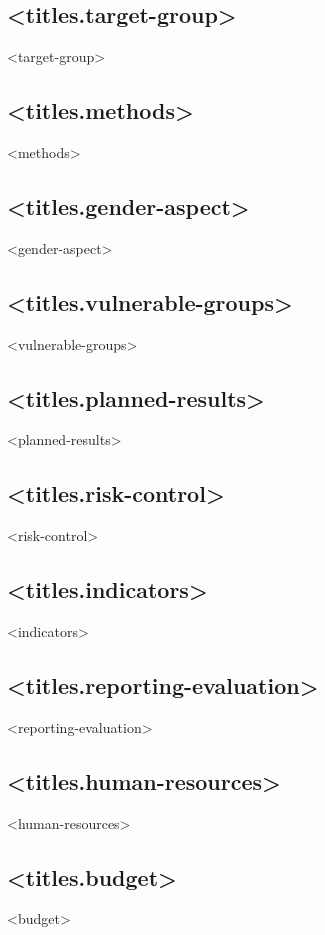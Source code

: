 \documentclass[twoside,a4paper]{article}
\begin{document}
		\subsection*{<titles.target-group>}
		    <target-group>
		
		\subsection*{<titles.methods>}
		    <methods>
		
		\subsection*{<titles.gender-aspect>}
		    <gender-aspect>
		
		\subsection*{<titles.vulnerable-groups>}
		    <vulnerable-groups>
		
		\subsection*{<titles.planned-results>}
		    <planned-results>
		
		\subsection*{<titles.risk-control>}
		    <risk-control>
		
		\subsection*{<titles.indicators>}
		    <indicators>
		
		\subsection*{<titles.reporting-evaluation>}
		    <reporting-evaluation>

		\subsection*{<titles.human-resources>}
		    <human-resources>
		
		\subsection*{<titles.budget>}
		    <budget>
		
\end{document}
